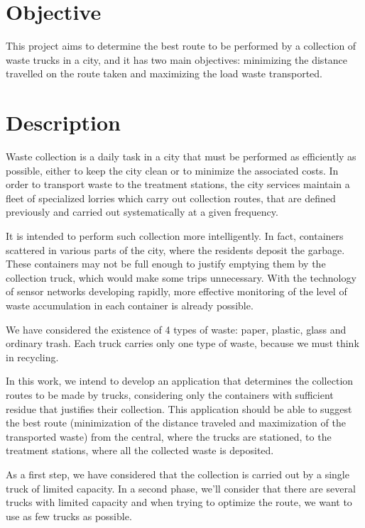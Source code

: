 \documentclass[a4paper]{article}
\begin{document}
\section{Objective}
\label{objective}

This project aims to determine the best route to be performed by a collection of waste trucks in a city, and it has two main objectives: minimizing the distance travelled on the route taken and maximizing the load waste transported.

\section{Description}
\label{description}

Waste collection is a daily task in a city that must be performed as efficiently as possible, either to keep the city clean or to minimize the associated costs. In order to transport waste to the treatment stations, the city services maintain a fleet of specialized lorries which carry out collection routes, that are defined previously and carried out systematically at a given frequency.

It is intended to perform such collection more intelligently. In fact, containers scattered in various parts of the city, where the residents deposit the garbage. These containers may not be full enough to justify emptying them by the collection truck, which would make some trips unnecessary. With the technology of sensor networks developing rapidly, more effective monitoring of the level of waste accumulation in each container is already possible.

We have considered the existence of 4 types of waste: paper, plastic, glass and ordinary trash. Each truck carries only one type of waste, because we must think in recycling.

In this work, we intend to develop an application that determines the collection routes to be made by trucks, considering only the containers with sufficient residue that justifies their collection. This application should be able to suggest the best route (minimization of the distance traveled and maximization of the transported waste) from the central, where the trucks are stationed, to the treatment stations, where all the collected waste is deposited.

As a first step, we have considered that the collection is carried out by a single truck of limited capacity. In a second phase, we'll consider that there are several trucks with limited capacity and when trying to optimize the route, we want to use as few trucks as possible.
\end{document}

